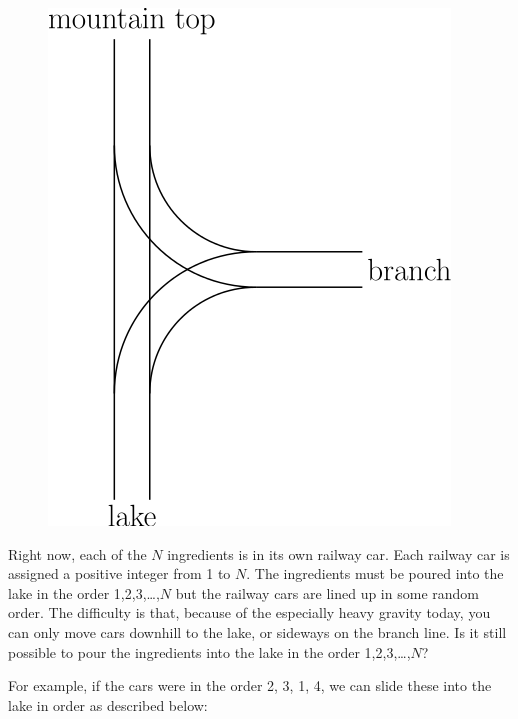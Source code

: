 \documentclass{problem-set}
\begin{document}
\begin{figure}[h]
    \centering
    \includegraphics[scale=0.5]{the-candy-mountain-1}
\end{figure}

\pushnewpage

Right now, each of the $N$ ingredients is in its own railway car. Each railway car is assigned a positive integer from 1 to $N$. The ingredients must be poured into the lake in the order 1,2,3,…,$N$ but the railway cars are lined up in some random order. The difficulty is that, because of the especially heavy gravity today, you can only move cars downhill to the lake, or sideways on the branch line. Is it still possible to pour the ingredients into the lake in the order 1,2,3,…,$N$?

For example, if the cars were in the order 2, 3, 1, 4, we can slide these into the lake in order as described below:
\end{document}
